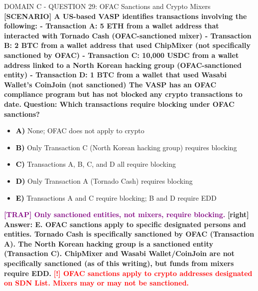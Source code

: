 \documentclass[11pt,a4paper]{beamer}
\newcommand{\redflag}[1]{\textcolor{red}{\textbf{[!] #1}}}
\newcommand{\trap}[1]{\textcolor{purple}{\textbf{[TRAP] #1}}}
\newcommand{\correct}[1]{\textcolor{green!50!black}{\textbf{[right] #1}}}
\newcommand{\scenario}[1]{\textcolor{blue!70!black}{\textbf{[SCENARIO] #1}}}
\newcommand{\option}[1]{\textcolor{black}{\textbf{#1}}}
\begin{document}
\begin{frame}{DOMAIN C - QUESTION 29: OFAC Sanctions and Crypto Mixers}
\scenario{A US-based VASP identifies transactions involving the following:
- Transaction A: 5 ETH from a wallet address that interacted with Tornado Cash (OFAC-sanctioned mixer)
- Transaction B: 2 BTC from a wallet address that used ChipMixer (not specifically sanctioned by OFAC)
- Transaction C: 10,000 USDC from a wallet address linked to a North Korean hacking group (OFAC-sanctioned entity)
- Transaction D: 1 BTC from a wallet that used Wasabi Wallet's CoinJoin (not sanctioned)
The VASP has an OFAC compliance program but has not blocked any crypto transactions to date.}
\vspace{0.2cm}
\textbf{Question: Which transactions require blocking under OFAC sanctions?}
\vspace{0.1cm}
\begin{itemize}
    \item \option{A)} None; OFAC does not apply to crypto
    \item \option{B)} Only Transaction C (North Korean hacking group) requires blocking
    \item \option{C)} Transactions A, B, C, and D all require blocking
    \item \option{D)} Only Transaction A (Tornado Cash) requires blocking
    \item \option{E)} Transactions A and C require blocking; B and D require EDD
\end{itemize}
\vspace{0.2cm}
\trap{Only sanctioned entities, not mixers, require blocking.}
\correct{Answer: E. OFAC sanctions apply to specific designated persons and entities. Tornado Cash is specifically sanctioned by OFAC (Transaction A). The North Korean hacking group is a sanctioned entity (Transaction C). ChipMixer and Wasabi Wallet/CoinJoin are not specifically sanctioned (as of this writing), but funds from mixers require EDD.}
\redflag{OFAC sanctions apply to crypto addresses designated on SDN List. Mixers may or may not be sanctioned.}
\end{frame}
\end{document}
